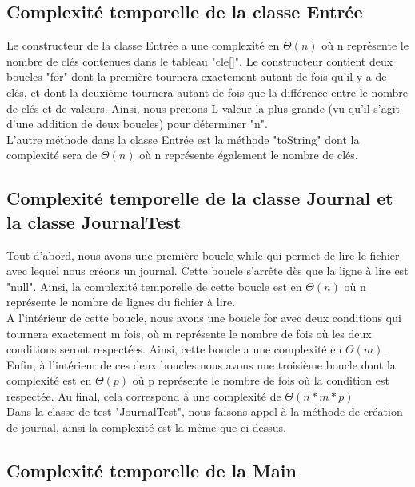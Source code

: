 \documentclass[a4paper]{article}
\begin{document}
\subsection*{Complexité temporelle de la classe Entrée}

Le constructeur de la classe Entrée a une complexité en $\Theta(n)$ où n représente le nombre de clés contenues dans le tableau "cle[]". Le constructeur contient deux boucles "for" dont la première tournera exactement autant de fois qu'il y a de clés, et dont la deuxième tournera autant de fois que la différence entre le nombre de clés et de valeurs. Ainsi, nous prenons L valeur la plus grande (vu qu'il s'agit d'une addition de deux boucles) pour déterminer "n". 
\\
L'autre méthode dans la classe Entrée est la méthode "toString" dont la complexité sera de $\Theta(n)$ où n représente également le nombre de clés. 
\\
\subsection*{Complexité temporelle de la classe Journal et la classe JournalTest}

Tout d'abord, nous avons une première boucle while qui permet de lire le fichier avec lequel nous créons un journal. Cette boucle s'arrête dès que la ligne à lire est "null". Ainsi, la complexité temporelle de cette boucle est en $\Theta(n)$ où n représente le nombre de lignes du fichier à lire. 
\\
A l'intérieur de cette boucle, nous avons une boucle for avec deux conditions qui tournera exactement m fois, où m représente le nombre de fois où les deux conditions seront respectées. Ainsi, cette boucle a une complexité en $\Theta(m)$. 
\\
Enfin, à l'intérieur de ces deux boucles nous avons une troisième boucle dont la complexité est en $\Theta(p)$ où p représente le nombre de fois où la condition est respectée. 
Au final, cela correspond à une complexité de $\Theta(n*m*p)$
\\
Dans la classe de test "JournalTest", nous faisons appel à la méthode de création de journal, ainsi la complexité est la même que ci-dessus. 
\\
\subsection*{Complexité temporelle de la Main}
\end{document}
